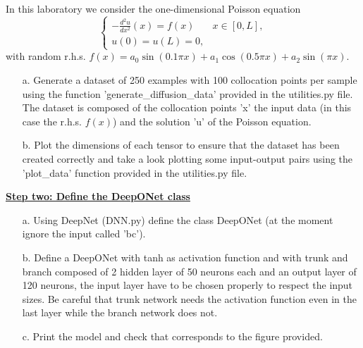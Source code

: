 \documentclass{article}
\newcommand{\step}[1]{\underline{\textbf{\large{#1}}} }
\begin{document}
    In this laboratory we consider the one-dimensional Poisson equation
    \[ 
    \begin{cases}
    -\frac{d^2u}{dx^2}(x) = f(x) \quad & x \in [0, L],\\
    u(0)=u(L)=0,
    \end{cases}
    \]
    with random r.h.s. $f(x) = a_0 \sin(0.1 \pi x) + a_1\cos(0.5 \pi x) +a_2 \sin( \pi x)$.
    \begin{itemize}
      \item[a.] Generate a dataset of 250 examples with 100 collocation points per sample using the function 'generate\_diffusion\_data' provided in the utilities.py file. The dataset is composed of the collocation points 'x' the input data (in this case the r.h.s. $f(x)$) and the solution 'u' of the Poisson equation.
      \item[b.] Plot the dimensions of each tensor to ensure that the dataset has been created correctly and take a look plotting some input-output pairs using the 'plot\_data' function provided in the utilities.py file.
    \end{itemize}

    \begin{center}\step{Step two: Define the DeepONet class}\end{center}
    \begin{itemize}
      \item[a.] Using DeepNet (DNN.py) define the class DeepONet (at the moment ignore the input called 'bc').
      \item[b.] Define a DeepONet with tanh as activation function and with trunk and branch composed of 2 hidden layer of 50 neurons each and an output layer of 120 neurons, the input layer have to be chosen properly to respect the input sizes. Be careful that trunk network needs the activation function even in the last layer while the branch network does not.
      \item[c.] Print the model and check that corresponds to the figure provided.
    \end{itemize}
\end{document}
